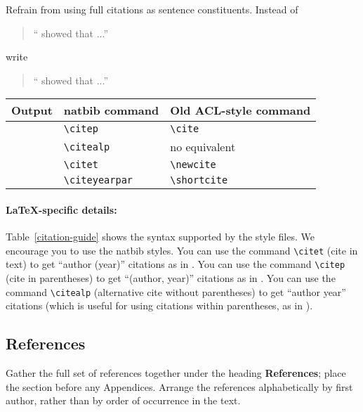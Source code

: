 \documentclass[11pt,a4paper]{article}
\begin{document}
Refrain from using full citations as sentence constituents.
Instead of
\begin{quote}
  ``\citep{Gusfield:97} showed that ...''
\end{quote}
write
\begin{quote}
``\citet{Gusfield:97} showed that ...''
\end{quote}

\begin{table*}
\centering
\begin{tabular}{lll}
\hline
\textbf{Output} & \textbf{natbib command} & \textbf{Old ACL-style command}\\
\hline
\citep{Gusfield:97} & \small\verb|\citep| & \small\verb|\cite| \\
\citealp{Gusfield:97} & \small\verb|\citealp| & no equivalent \\
\citet{Gusfield:97} & \small\verb|\citet| & \small\verb|\newcite| \\
\citeyearpar{Gusfield:97} & \small\verb|\citeyearpar| & \small\verb|\shortcite| \\
\hline
\end{tabular}
\caption{\label{citation-guide}
Citation commands supported by the style file.
The style is based on the natbib package and supports all natbib citation commands.
It also supports commands defined in previous ACL style files for compatibility.
}
\end{table*}

\paragraph{\LaTeX-specific details:}
Table~\ref{citation-guide} shows the syntax supported by the style files.
We encourage you to use the natbib styles.
You can use the command {\small\verb|\citet|} (cite in text) to get ``author (year)'' citations as in \citet{Gusfield:97}.
You can use the command {\small\verb|\citep|} (cite in parentheses) to get ``(author, year)'' citations as in \citep{Gusfield:97}.
You can use the command {\small\verb|\citealp|} (alternative cite without  parentheses) to get ``author year'' citations (which is useful for  using citations within parentheses, as in \citealp{Gusfield:97}).


\subsection{References}
Gather the full set of references together under the heading \textbf{References}; place the section before any Appendices. 
Arrange the references alphabetically by first author, rather than by order of occurrence in the text.
\end{document}
